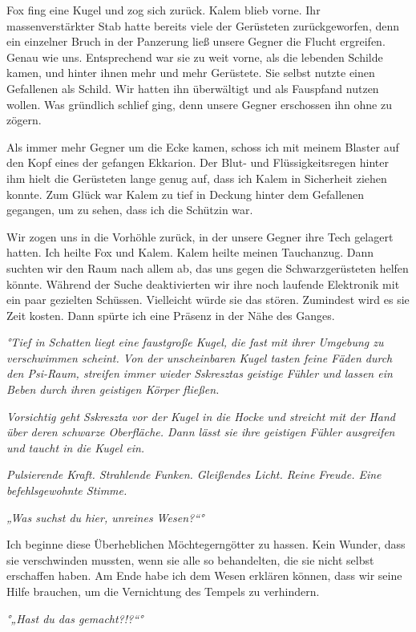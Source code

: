 \documentclass[11pt]{scrartcl}
\begin{document}
Fox fing eine Kugel und zog sich zurück. Kalem blieb vorne. Ihr
massenverstärkter Stab hatte bereits viele der Gerüsteten
zurückgeworfen, denn ein einzelner Bruch in der Panzerung ließ unsere
Gegner die Flucht ergreifen. Genau wie uns. Entsprechend war sie zu weit
vorne, als die lebenden Schilde kamen, und hinter ihnen mehr und mehr
Gerüstete. Sie selbst nutzte einen Gefallenen als Schild. Wir hatten ihn
überwältigt und als Fauspfand nutzen wollen. Was gründlich schlief ging,
denn unsere Gegner erschossen ihn ohne zu zögern.

Als immer mehr Gegner um die Ecke kamen, schoss ich mit meinem Blaster
auf den Kopf eines der gefangen Ekkarion. Der Blut- und
Flüssigkeitsregen hinter ihm hielt die Gerüsteten lange genug auf, dass
ich Kalem in Sicherheit ziehen konnte. Zum Glück war Kalem zu tief in
Deckung hinter dem Gefallenen gegangen, um zu sehen, dass ich die
Schützin war.

Wir zogen uns in die Vorhöhle zurück, in der unsere Gegner ihre Tech
gelagert hatten. Ich heilte Fox und Kalem. Kalem heilte meinen
Tauchanzug. Dann suchten wir den Raum nach allem ab, das uns gegen die
Schwarzgerüsteten helfen könnte. Während der Suche deaktivierten wir
ihre noch laufende Elektronik mit ein paar gezielten Schüssen.
Vielleicht würde sie das stören. Zumindest wird es sie Zeit kosten. Dann
spürte ich eine Präsenz in der Nähe des Ganges.

\emph{°Tief in Schatten liegt eine faustgroße Kugel, die fast mit ihrer
Umgebung zu verschwimmen scheint. Von der unscheinbaren Kugel tasten
feine Fäden durch den Psi-Raum, streifen immer wieder Sskresztas
geistige Fühler und lassen ein Beben durch ihren geistigen Körper
fließen.}

\emph{Vorsichtig geht Sskreszta vor der Kugel in die Hocke und streicht
mit der Hand über deren schwarze Oberfläche. Dann lässt sie ihre
geistigen Fühler ausgreifen und taucht in die Kugel ein.}

\emph{Pulsierende Kraft. Strahlende Funken. Gleißendes Licht. Reine
Freude. Eine befehlsgewohnte Stimme.}

\emph{„Was suchst du hier, unreines Wesen?``°}

Ich beginne diese Überheblichen Möchtegerngötter zu hassen. Kein Wunder,
dass sie verschwinden mussten, wenn sie alle so behandelten, die sie
nicht selbst erschaffen haben. Am Ende habe ich dem Wesen erklären
können, dass wir seine Hilfe brauchen, um die Vernichtung des Tempels zu
verhindern.

\emph{°„Hast du das gemacht?!?``°}
\end{document}
